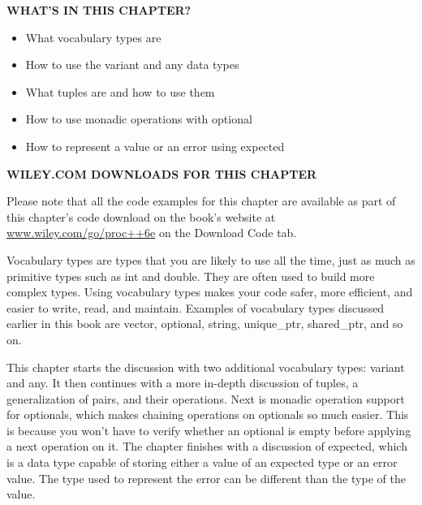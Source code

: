 \noindent
\textbf{WHAT’S IN THIS CHAPTER?}

\begin{itemize}
\item
What vocabulary types are

\item
How to use the variant and any data types

\item
What tuples are and how to use them

\item
How to use monadic operations with optional

\item
How to represent a value or an error using expected
\end{itemize}

\noindent
\textbf{WILEY.COM DOWNLOADS FOR THIS CHAPTER}

Please note that all the code examples for this chapter are available as part of this chapter’s code download on the book’s website at \url{www.wiley.com/go/proc++6e} on the Download Code tab.

Vocabulary types are types that you are likely to use all the time, just as much as primitive types such as int and double. They are often used to build more complex types. Using vocabulary types makes your code safer, more efficient, and easier to write, read, and maintain. Examples of vocabulary types discussed earlier in this book are vector, optional, string, unique\_ptr, shared\_ptr, and so on.

This chapter starts the discussion with two additional vocabulary types: variant and any. It then continues with a more in-depth discussion of tuples, a generalization of pairs, and their operations. Next is monadic operation support for optionals, which makes chaining operations on optionals so much easier. This is because you won’t have to verify whether an optional is empty before applying a next operation on it. The chapter finishes with a discussion of expected, which is a data type capable of storing either a value of an expected type or an error value. The type used to represent the error can be different than the type of the value.